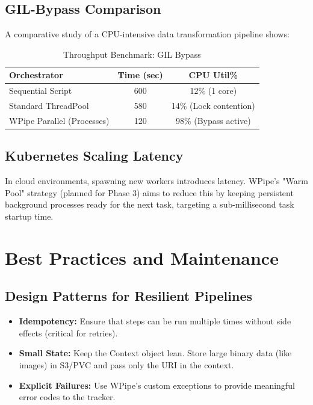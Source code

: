 \documentclass[12pt,a4paper]{report}
\begin{document}
\section{GIL-Bypass Comparison}
A comparative study of a CPU-intensive data transformation pipeline shows:
\begin{table}[H]
    \centering
    \caption{Throughput Benchmark: GIL Bypass}
    \begin{tabular}{lcc}
        \toprule
        \textbf{Orchestrator} & \textbf{Time (sec)} & \textbf{CPU Util\%} \\
        \midrule
        Sequential Script & 600 & 12\% (1 core) \\
        Standard ThreadPool & 580 & 14\% (Lock contention) \\
        WPipe Parallel (Processes) & 120 & 98\% (Bypass active) \\
        \bottomrule
    \end{tabular}
\end{table}

\cleardoublepage
\section{Kubernetes Scaling Latency}
In cloud environments, spawning new workers introduces latency. WPipe's "Warm Pool" strategy (planned for Phase 3) aims to reduce this by keeping persistent background processes ready for the next task, targeting a sub-millisecond task startup time.

\chapter{Best Practices and Maintenance}
\cleardoublepage

\section{Design Patterns for Resilient Pipelines}
\begin{itemize}
    \item \textbf{Idempotency:} Ensure that steps can be run multiple times without side effects (critical for retries).
    \item \textbf{Small State:} Keep the Context object lean. Store large binary data (like images) in S3/PVC and pass only the URI in the context.
    \item \textbf{Explicit Failures:} Use WPipe's custom exceptions to provide meaningful error codes to the tracker.
\end{itemize}
\end{document}
